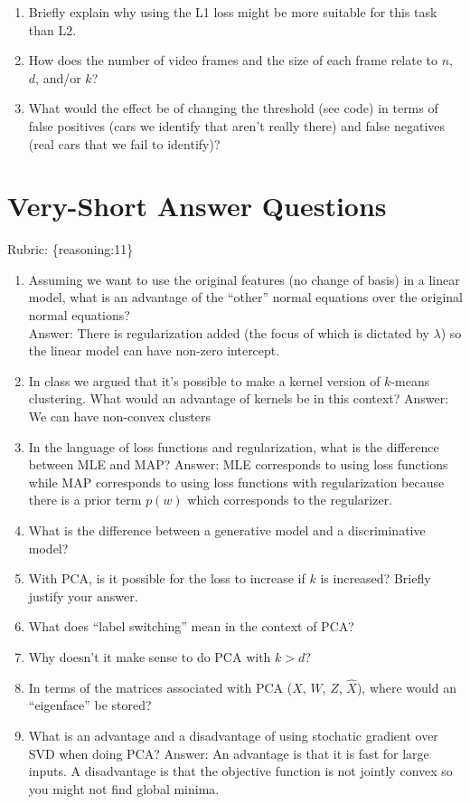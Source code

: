 \documentclass{article}
\def\rubric#1{\gre{Rubric: \{#1\}}}{}
\def\gre#1{{\color{gre}#1}}
\def\ans#1{\gre{Answer: #1}}{}
\def\enum#1{\begin{enumerate}#1\end{enumerate}}
\begin{document}
\enum{
\item Briefly explain why using the L1 loss might be more suitable for this task than L2. 
\item How does the number of video frames and the size of each frame relate to $n$, $d$, and/or $k$?
\item What would the effect be of changing the threshold (see code) in terms of false positives (cars we identify that aren't really there) and false negatives (real cars that we fail to identify)?
}

\section{Very-Short Answer Questions}
\rubric{reasoning:11}

\enum{
\item Assuming we want to use the original features (no change of basis) in a linear model, what is an advantage of the ``other'' normal equations over the original normal equations? \\
\ans{There is regularization added (the focus of which is dictated by $\lambda$) so the linear model can have non-zero intercept. }
\item In class we argued that it's possible to make a kernel version of $k$-means clustering. What would an advantage of kernels be in this context?
\ans{We can have non-convex clusters}
\item In the language of loss functions and regularization, what is the difference between MLE and MAP?
\ans{MLE corresponds to using loss functions while MAP corresponds to using loss functions with regularization because there is a prior term $p(w)$ which corresponds to the regularizer.}
\item What is the difference between a generative model and a discriminative model?
\item With PCA, is it possible for the loss to increase if $k$ is increased? Briefly justify your answer.
\item What does ``label switching'' mean in the context of PCA?
\item Why doesn't it make sense to do PCA with $k > d$?
\item In terms of the matrices associated with PCA ($X$, $W$, $Z$, $\hat{X}$), where would an ``eigenface'' be stored?
\item What is an advantage and a disadvantage of using stochatic gradient over SVD when doing PCA?
\ans{An advantage is that it is fast for large inputs. A disadvantage is that the objective function is not jointly convex so you might not find global minima.}
}
\end{document}
